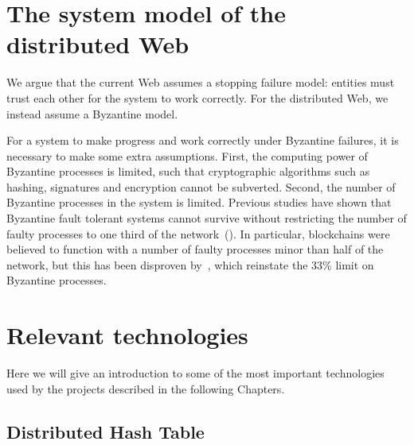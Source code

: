\documentclass[mscthesis]{usiinfthesis}
\begin{document}
\section{The system model of the distributed Web}\label{sec:model}
We argue that the current Web assumes a stopping failure model: entities must trust each other for the system to work correctly.
For the distributed Web, we instead assume a Byzantine model.

For a system to make progress and work correctly under Byzantine failures, it is necessary to make some extra assumptions.
First, the computing power of Byzantine processes is limited, such that cryptographic algorithms such as hashing, signatures and encryption cannot be subverted.
Second, the number of Byzantine processes in the system is limited. Previous studies have shown that Byzantine fault tolerant systems cannot survive without restricting the number of faulty processes to one third of the network~(\cite{lamport1982byzantine}). In particular, blockchains were believed to function with a number of faulty processes minor than half of the network, but this has been disproven by~\cite{eyal2018majority}, which reinstate the 33\% limit on Byzantine processes.


 
\section{Relevant technologies}

Here we will give an introduction to some of the most important technologies used by the projects described in the following Chapters.

\subsection{Distributed Hash Table}\label{tech:dht}
\end{document}
